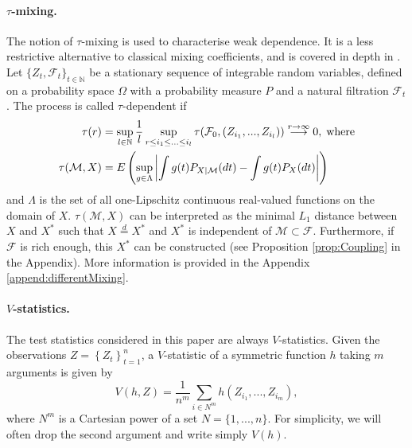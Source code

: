 \paragraph{$\tau$-mixing.} The notion of $\tau$-mixing is used to characterise weak dependence. It is a less restrictive alternative to classical mixing coefficients, and is covered in depth in \cite{dedecker2007weak}. Let $\{Z_t,\mathcal{F}_t\}_{t \in \mathbb{N}}$  be a stationary sequence of integrable random variables, defined on a probability space $\Omega$ with a probability measure $P$ and a natural filtration $\mathcal{F}_t$. The process  is called $\tau$-dependent if 
\begin{align*}
\tau(r) &= \sup_{l \in \mathbb{N}} \frac 1 l \sup_{ r \leq i_1 \leq ... \leq i_l} \tau( \mathcal F_0,(Z_{i_1},...,Z_{i_l}) )  \overset{r \to \infty}{\longrightarrow} 0,\;\text{where} \\
\tau(\mathcal{M},X) &=  E \left( \sup_{g \in \Lambda} \left| \int g(t) P_{X|\mathcal{M}}(dt) - \int g(t) P_X(dt) \right| \right)
\end{align*}
and $\Lambda$ is the set of all one-Lipschitz continuous real-valued functions on the domain of $X$. $\tau(\mathcal M,X)$ can be interpreted as the minimal $L_1$ distance between $X$ and $X^*$ such that $X \overset{d}{=}X^*$ and $X^*$ is independent of $\mathcal M \subset \mathcal F$. Furthermore, if $\mathcal F$ is rich enough, this $X^*$ can be constructed (see Proposition \ref{prop:Coupling} in the Appendix). More information is provided in the Appendix \ref{append:differentMixing}.

%  
\paragraph{$V$-statistics.} The test statistics considered in this paper are always $V$-statistics. Given the observations $Z=\left\{Z_t\right\}_{t=1}^n$, a $V$-statistic of a symmetric function $h$ taking $m$ arguments is given by 
\begin{equation}
\label{def:Vstat}
V(h,Z) = \frac{1}{n^m} \sum_{i \in N^m} \nolimits h(Z_{i_1},...,Z_{i_m}),
\end{equation}
where $N^m$ is a Cartesian power of a set $N= \{1,...,n\}$. For simplicity, we will often drop the second argument and write simply $V(h)$. 

